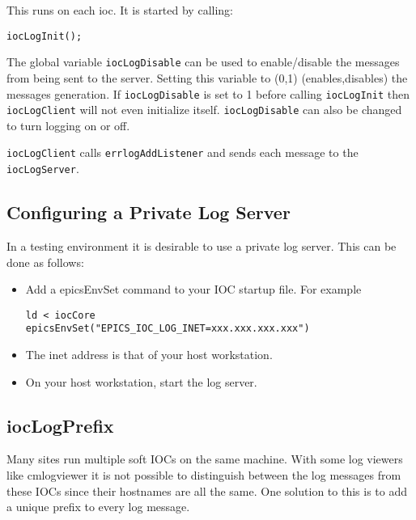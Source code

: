 This runs on each ioc. It is started by calling:

\begin{verbatim}
iocLogInit();
\end{verbatim}

The global variable \verb|iocLogDisable| can be used to enable/disable the messages from being sent to the server. Setting 
this variable to (0,1) (enables,disables) the messages generation. If \verb|iocLogDisable| is set to 1 before calling 
\verb|iocLogInit| then \verb|iocLogClient| will not even initialize itself. \verb|iocLogDisable| can also be changed to turn 
logging on or off.

\verb|iocLogClient| calls \verb|errlogAddListener| and sends each message to the \verb|iocLogServer|.

\subsection{Configuring a Private Log Server}

In a testing environment it is desirable to use a private log server. This can be done as follows:

\begin{itemize}

\item Add a epicsEnvSet command to your IOC startup file. For example

\begin{verbatim}
ld < iocCore
epicsEnvSet("EPICS_IOC_LOG_INET=xxx.xxx.xxx.xxx")
\end{verbatim}

\item The inet address is that of your host workstation.

\item On your host workstation, start the log server.

\end{itemize}

\subsection{iocLogPrefix}
\label{iocLogPrefix}

Many sites run multiple soft IOCs on the same machine.
With some log viewers like cmlogviewer it is not possible to distinguish between the log messages from these IOCs since their hostnames are all the same.
One solution to this is to add a unique prefix to every log message.

